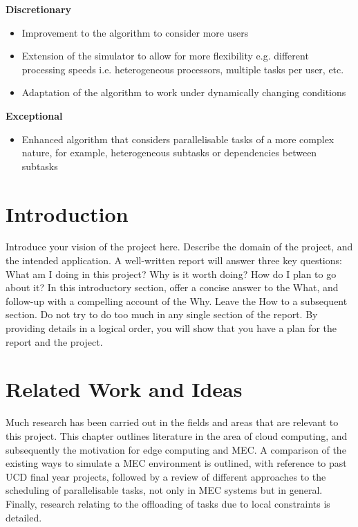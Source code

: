 \documentclass[]{UCD_CS_FYP_Report}
\begin{document}
\textbf{Discretionary}
\vspace{-1.5em}
\begin{itemize}
    \item Improvement to the algorithm to consider more users
    \item Extension of the simulator to allow for more flexibility e.g. different processing speeds i.e. heterogeneous processors, multiple tasks per user, etc.
    \item Adaptation of the algorithm to work under dynamically changing conditions
\end{itemize}
\vspace{-0.5em}

\textbf{Exceptional}
\vspace{-1.5em}
\begin{itemize}
    \item Enhanced algorithm that considers parallelisable tasks of a more complex nature, for
example, heterogeneous subtasks or dependencies between subtasks
\end{itemize}

\chapter{Introduction}
Introduce your vision of the project here. Describe the domain of the project, and the intended application. A well-written report will answer three key questions: What am I doing in this project? Why is it worth doing? How do I plan to go about it? In this introductory section, offer a concise answer to the What, and follow-up with a compelling account of the Why. Leave the How to a subsequent section. Do not try to do too much in any single section of the report. By providing details in a logical order, you will show that you have a plan for the report and the project.  

\chapter{Related Work and Ideas}
Much research has been carried out in the fields and areas that are relevant to this project. This chapter outlines literature in the area of cloud computing, and subsequently the motivation for edge computing and MEC. A comparison of the existing ways to simulate a MEC environment is outlined, with reference to past UCD final year projects, followed by a review of different approaches to the scheduling of parallelisable tasks, not only in MEC systems but in general. Finally, research relating to the offloading of tasks due to local constraints is detailed.
\end{document}
